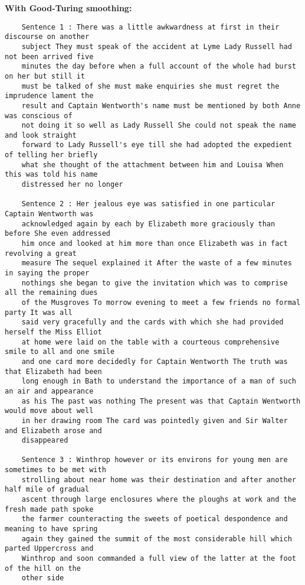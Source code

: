 \documentclass[11pt, a4paper]{article}
\begin{document}
\begin{enumerate}
	\textbf{With Good-Turing smoothing:}
	\begin{verbatim}
	Sentence 1 : There was a little awkwardness at first in their discourse on another 
	subject They must speak of the accident at Lyme Lady Russell had not been arrived five 
	minutes the day before when a full account of the whole had burst on her but still it 
	must be talked of she must make enquiries she must regret the imprudence lament the 
	result and Captain Wentworth's name must be mentioned by both Anne was conscious of 
	not doing it so well as Lady Russell She could not speak the name and look straight 
	forward to Lady Russell's eye till she had adopted the expedient of telling her briefly 
	what she thought of the attachment between him and Louisa When this was told his name 
	distressed her no longer
	
	Sentence 2 : Her jealous eye was satisfied in one particular Captain Wentworth was 
	acknowledged again by each by Elizabeth more graciously than before She even addressed 
	him once and looked at him more than once Elizabeth was in fact revolving a great 
	measure The sequel explained it After the waste of a few minutes in saying the proper 
	nothings she began to give the invitation which was to comprise all the remaining dues 
	of the Musgroves To morrow evening to meet a few friends no formal party It was all 
	said very gracefully and the cards with which she had provided herself the Miss Elliot 
	at home were laid on the table with a courteous comprehensive smile to all and one smile 
	and one card more decidedly for Captain Wentworth The truth was that Elizabeth had been 
	long enough in Bath to understand the importance of a man of such an air and appearance 
	as his The past was nothing The present was that Captain Wentworth would move about well 
	in her drawing room The card was pointedly given and Sir Walter and Elizabeth arose and 
	disappeared
	
	Sentence 3 : Winthrop however or its environs for young men are sometimes to be met with 
	strolling about near home was their destination and after another half mile of gradual 
	ascent through large enclosures where the ploughs at work and the fresh made path spoke 
	the farmer counteracting the sweets of poetical despondence and meaning to have spring 
	again they gained the summit of the most considerable hill which parted Uppercross and 
	Winthrop and soon commanded a full view of the latter at the foot of the hill on the 
	other side
	

\end{verbatim}
\end{enumerate}
\end{document}
